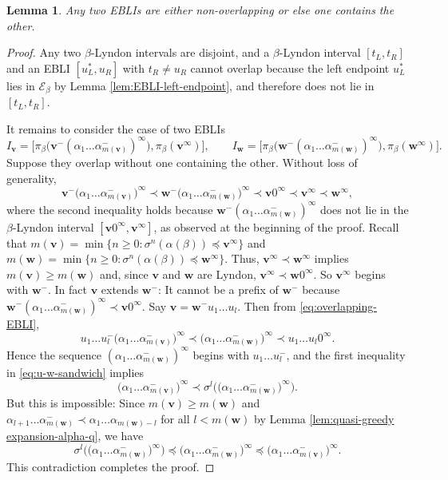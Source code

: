\documentclass[11pt]{amsart}
\newtheorem{lemma}[theorem]{Lemma}
\theoremstyle{definition}
\theoremstyle{remark}
\numberwithin{equation}{section}
\newcommand{\EE}{\mathscr{E}}
\renewcommand{\v}{\mathbf{v}}
\newcommand{\w}{\mathbf{w}}
\newcommand{\f}{\infty}
\newcommand{\al}{\alpha}
\newcommand{\lle}{\preccurlyeq}
\newcommand{\si}{\sigma}
\begin{document}
\begin{lemma} \label{lem:no-overlap-EBLI}
Any two EBLIs are either non-overlapping or else one contains the other.
\end{lemma}

\begin{proof}
Any two $\beta$-Lyndon intervals are disjoint, and a $\beta$-Lyndon interval $[t_L,t_R]$ and an EBLI $[u_L^*,u_R]$ {with $t_R\neq u_R$} cannot overlap because the left endpoint $u_L^*$ lies in $\EE_\beta$ by Lemma \ref{lem:EBLI-left-endpoint}, and therefore does not lie in $[t_L,t_R]$.

It remains to consider the case of two EBLIs 
\[
I_\v=\big[\pi_\beta\big(\v^-(\al_1\dots\al_{m(\v)}^-)^\f\big),\pi_\beta(\v^\f)\big], \qquad I_\w=\big[\pi_\beta\big(\w^-(\al_1\dots\al_{m(\w)}^-)^\f\big),\pi_\beta(\w^\f)\big].
\]
Suppose they overlap without one containing the other. Without loss of generality,
\begin{equation} \label{eq:overlapping-EBLI}
\v^-\big(\al_1\dots\al_{m(\v)}^-\big)^\f\prec \w^-\big(\al_1\dots\al_{m(\w)}^-\big)^\f\prec \v0^\f\prec \v^\f\prec \w^\f,
\end{equation}
where the second inequality holds because $\w^-(\al_1\dots\al_{m(\w)}^-)^\f$ does not lie in the $\beta$-Lyndon interval $[\v0^\f,\v^\f]$, as observed at the beginning of the proof.
{Recall that $m(\v)=\min\{n\geq 0:\si^n(\al(\beta))\lle \v^\f\}$ and $m(\w)=\min\{n\geq 0:\si^n(\al(\beta))\lle \w^\f\}$. Thus, $\v^\f\prec \w^\f$ implies $m(\v)\geq m(\w)$ and, since $\v$ and $\w$ are Lyndon, $\v^\f\prec \w0^\f$. So $\v^\f$ begins with $\w^-$.} In fact $\v$ extends $\w^-$: It cannot be a prefix of $\w^-$ because $\w^-(\al_1\dots\al_{m(\w)}^-)^\f\prec \v0^\f$. Say $\v=\w^-u_1\dots u_l$. Then from \eqref{eq:overlapping-EBLI},
\begin{equation} \label{eq:u-w-sandwich}
u_1\dots u_l^-\big(\al_1\dots\al_{m(\v)}^-\big)^\f\prec \big(\al_1\dots\al_{m(\w)}^-\big)^\f\prec u_1\dots u_l0^\f.
\end{equation}
Hence the sequence $(\al_1\dots\al_{m(\w)}^-)^\f$ begins with $u_1\dots u_l^-$, and the first inequality in \eqref{eq:u-w-sandwich} implies
\[
\big(\al_1\dots\al_{m(\v)}^-\big)^\f\prec \si^l\big(\big(\al_1\dots\al_{m(\w)}^-\big)^\f\big).
\]
But this is impossible: {Since $m(\v)\geq m(\w)$ and $\al_{l+1}\dots \al_{m(\w)}^-\prec\al_1\dots\al_{m(\w)-l}$ for all $l<m(\w)$ by Lemma \ref{lem:quasi-greedy expansion-alpha-q}, we have}
\[
\si^l\big(\big(\al_1\dots\al_{m(\w)}^-\big)^\f\big)\lle \big(\al_1\dots\al_{m(\w)}^-\big)^\f \lle \big(\al_1\dots\al_{m(\v)}^-\big)^\f.
\]
This contradiction completes the proof.
\end{proof}
\end{document}
